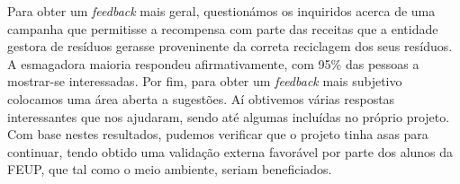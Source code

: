 \documentclass[11pt, a4paper, oneside]{book}
\begin{document}
Para obter um \textit{feedback} mais geral, questionámos os inquiridos acerca de uma campanha que permitisse a recompensa com parte das receitas que a entidade gestora de resíduos gerasse proveninente da correta reciclagem dos seus resíduos. A esmagadora maioria respondeu afirmativamente, com 95\% das pessoas a mostrar-se interessadas.
Por fim, para obter um \textit{feedback} mais subjetivo colocamos uma área aberta a sugestões. Aí obtivemos várias respostas interessantes que nos ajudaram, sendo até algumas incluídas no próprio projeto.
Com base nestes resultados, pudemos verificar que o projeto tinha asas para continuar, tendo obtido uma validação externa favorável por parte dos alunos da FEUP, que tal como o meio ambiente, seriam beneficiados.

\nocite{*}

\clearpage
{}



\end{document}
